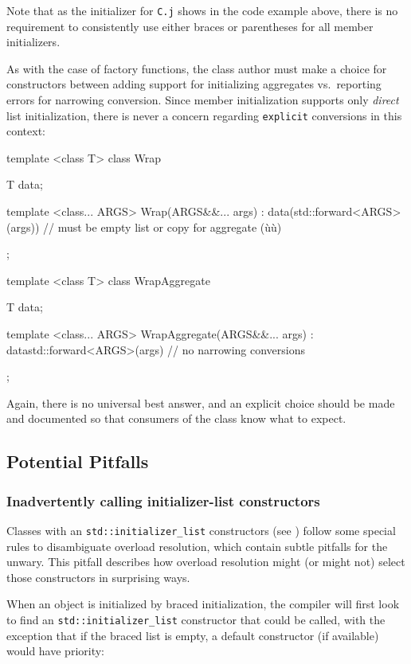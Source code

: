 \noindent Note that as the initializer for \lstinline!C.j! shows in the code example
above, there is no requirement to consistently use either braces or
parentheses for all member initializers.

As with the case of factory functions, the class author must make a
choice for constructors between adding support for initializing
aggregates vs.~reporting errors for narrowing conversion. Since member
initialization supports only \emph{direct} list initialization, there is
never a concern regarding \lstinline!explicit! conversions in this context:

\begin{emcppslisting}
template <class T>
class Wrap
{
    T data;

    template <class... ARGS>
    Wrap(ARGS&&... args)
    : data(std::forward<ARGS>(args))  // must be empty list or copy for aggregate (ù{}ù)
    {
    }
};

template <class T>
class WrapAggregate
{
    T data;

    template <class... ARGS>
    WrapAggregate(ARGS&&... args)
    : data{std::forward<ARGS>(args)}  // no narrowing conversions
    {
    }
};
\end{emcppslisting}


\noindent Again, there is no universal best answer, and an explicit choice should
be made and documented so that consumers of the class know what to
expect.

\subsection[Potential Pitfalls]{Potential Pitfalls}\label{potential-pitfalls-bracedinit}

\subsubsection[Inadvertently calling initializer-list constructors]{Inadvertently calling initializer-list constructors}\label{inadvertently-calling-initializer-list-constructors}

Classes with an \lstinline!std::initializer_list! constructors (see
) follow some special rules to disambiguate
overload resolution, which contain subtle pitfalls for the unwary. This
pitfall describes how overload resolution might (or might not) select
those constructors in surprising ways.

When an object is initialized by braced initialization, the compiler
will first look to find an \lstinline!std::initializer_list! constructor
that could be called, with the exception that if the braced list is
empty, a default constructor (if available) would have priority:

